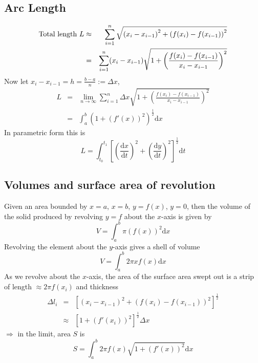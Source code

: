 \documentclass[12pt]{report}
\theoremstyle{definition}
\begin{document}
\subsection{Arc Length}
\begin{eqnarray*}
    \textnormal{Total length } L &\approx & \sum_{i=1}^{n} \sqrt{{(x_i - x_{i-1})}^{2} + {(f(x_i) - f(x_{i-1}))}^{2}} \\
                                 &=& \sum_{i=1}^{n} (x_i - x_{i-1}) 
                                 \sqrt{1 + {\left(\frac{f(x_i)-f(x_{i-1})}{x_i-x_{i-1}}\right)}^{2}}
\end{eqnarray*}
Now let $x_i - x_{i-1} = h = \frac{b-a}{n} := \Delta x$,
\begin{eqnarray*}
    L &=& \lim_{n \rightarrow \infty} 
      \sum_{i=1}^{n} \Delta x \sqrt{1 + {\left(\frac{f(x_i) - f(x_{i-1})}{x_i - x_{i-1}}\right)}^{2}} \\
      &=& \int_a^{b} {\left(1+{(f'(x))}^{2}\right)}^{\frac{1}{2}} \mathrm{d}x
\end{eqnarray*}
In parametric form this is \[
    L = \int_{t_0}^{t_1} {\left[{\left(\frac{\mathrm{d}x}{\mathrm{d}t}\right)}^{2} + 
    {\left(\frac{\mathrm{d}y}{\mathrm{d}t}\right)}^{2} \right]}^{\frac{1}{2}} \mathrm{d}t
\]
\subsection{Volumes and surface area of revolution}
Given an area bounded by $x=a$, $x=b$, $y=f(x)$, $y=0$, then the volume of the solid produced by revolving $y=f$
about the $x$-axis is given by\[
    V = \int_a^{b} \pi {(f(x))}^{2} \mathrm{d}x
\]
Revolving the element about the $y$-axis gives a shell of volume \[
    V = \int_a^{b} 2\pi x f(x) \mathrm{d}x
\]
As we revolve about the $x$-axis, the area of the surface area swept out is a strip of length $\approx 2\pi f(x_i)$
and thickness
\begin{eqnarray*}
    \Delta l_i &= & {[{(x_i - x_{i-1})}^{2} + {(f(x_i) - f(x_{i-1}))}^{2}]}^{\frac{1}{2}} \\
               &\approx & {[1 + {{(f'(x_i))}^{2}}]}^{\frac{1}{2}} \Delta x
\end{eqnarray*}
$\Rightarrow$ in the limit, area $S$ is \[
    S = \int_a^{b} 2\pi f(x) \sqrt{1 + {(f'(x))}^{2}} \mathrm{d}x
\]
\end{document}
